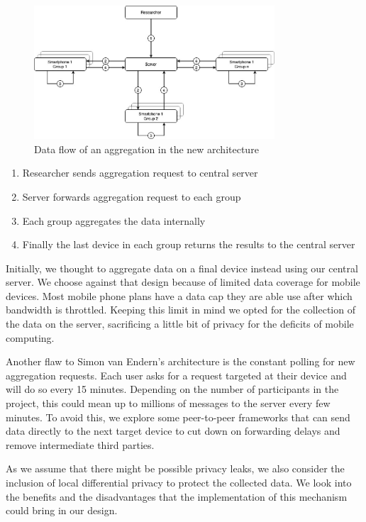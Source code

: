 \begin{figure}[htbp]
  \centering
  \includegraphics[width=0.8\textwidth]{figures/ar}
  \caption{Data flow of an aggregation in the new architecture} \label{fig:ar}
\end{figure}

\begin{enumerate}
	\item Researcher sends aggregation request to central server
	\item Server forwards aggregation request to each group
	\item Each group aggregates the data internally
	\item Finally the last device in each group returns the results to the central server
\end{enumerate}

Initially, we thought to aggregate data on a final device instead using our central server. We choose against that design because of limited data coverage for mobile devices. Most mobile phone plans have a data cap they are able use after which bandwidth is throttled. Keeping this limit in mind we opted for the collection of the data on the server, sacrificing a little bit of privacy for the deficits of mobile computing.

Another flaw to Simon van Endern's architecture is the constant polling for new aggregation requests. Each user asks for a request targeted at their device and will do so every 15 minutes. Depending on the number of participants in the project, this could mean up to millions of messages to the server every few minutes. To avoid this, we explore some peer-to-peer frameworks that can send data directly to the next target device to cut down on forwarding delays and remove intermediate third parties.

As we assume that there might be possible privacy leaks, we also consider the inclusion of local differential privacy to protect the collected data. We look into the benefits and the disadvantages that the implementation of this mechanism could bring in our design.

